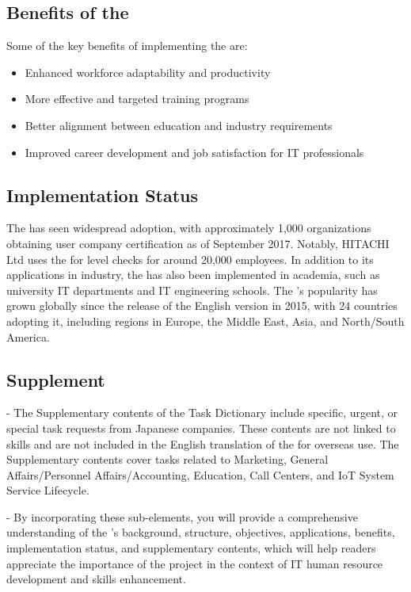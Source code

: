 \subsection{Benefits of the }
Some of the key benefits of implementing the  are:
\begin{itemize}
    \item Enhanced workforce adaptability and productivity
    \item More effective and targeted training programs
    \item Better alignment between education and industry requirements
    \item Improved career development and job satisfaction for IT professionals
\end{itemize}


\subsection{ Implementation Status}
The  has seen widespread adoption, with approximately 1,000 organizations obtaining user company certification as of September 2017. Notably, HITACHI Ltd uses the  for level checks for around 20,000 employees. In addition to its applications in industry, the  has also been implemented in academia, such as university IT departments and IT engineering schools. The 's popularity has grown globally since the release of the English version in 2015, with 24 countries adopting it, including regions in Europe, the Middle East, Asia, and North/South America.

\subsection{ Supplement}
- The Supplementary contents of the  Task Dictionary include specific, urgent, or special task requests from Japanese companies. These contents are not linked to skills and are not included in the English translation of the  for overseas use. The Supplementary contents cover tasks related to Marketing, General Affairs/Personnel Affairs/Accounting, Education, Call Centers, and IoT System Service Lifecycle.

- By incorporating these sub-elements, you will provide a comprehensive understanding of the 's background, structure, objectives, applications, benefits, implementation status, and supplementary contents, which will help readers appreciate the importance of the project in the context of IT human resource development and skills enhancement.


